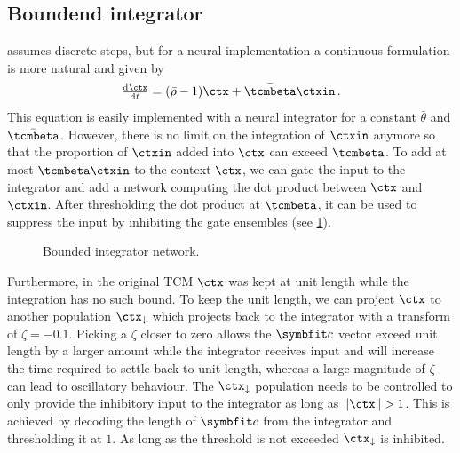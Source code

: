 \subsection{Boundend integrator}
 assumes discrete steps, but for a neural implementation a continuous formulation is more natural and given by
\begin{equation}
    \od{\ctx}{t} = (\bar{\rho} - 1) \ctx + \bar{\tcmbeta} \ctxin\,\text{.}
\end{equation}
This equation is easily implemented with a neural integrator for a constant $\bar{\theta}$ and $\bar{\tcmbeta}$.
However, there is no limit on the integration of $\ctxin$ anymore so that the proportion of $\ctxin$ added into $\ctx$ can exceed $\tcmbeta$.
To add at most $\tcmbeta \ctxin$ to the context $\ctx$, we can gate the input to the integrator and add a network computing the dot product between $\ctx$ and $\ctxin$.
After thresholding the dot product at $\tcmbeta$, it can be used to suppress the input by inhibiting the gate ensembles (see \cref{fig:ctx-bounded-integrator}).
\begin{figure}
    \centering
    \caption{Bounded integrator network.}\label{fig:ctx-bounded-integrator}
\end{figure}
Furthermore, in the original TCM $\ctx$ was kept at unit length while the integration has no such bound.
To keep the unit length, we can project $\ctx$ to another population $\ctx_{\downarrow}$ which projects back to the integrator with a transform of $\zeta = -0.1$.
Picking a $\zeta$ closer to zero allows the $\vc c$ vector exceed unit length by a larger amount while the integrator receives input and will increase the time required to settle back to unit length, whereas a large magnitude of $\zeta$ can lead to oscillatory behaviour.
The $\ctx_{\downarrow}$ population needs to be controlled to only provide the inhibitory input to the integrator as long as $\lVert\ctx\rVert > 1$.
This is achieved by decoding the length of $\vc c$ from the integrator and thresholding it at $1$.
As long as the threshold is not exceeded $\ctx_{\downarrow}$ is inhibited.

